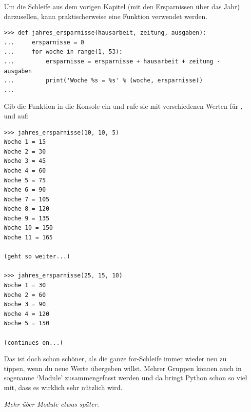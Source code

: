 Um die Schleife aus dem vorigen Kapitel (mit den Ersparnissen über das Jahr) darzusellen, kann praktischerweise eine Funktion verwendet werden.

\begin{Verbatim}[frame=single]
>>> def jahres_ersparnisse(hausarbeit, zeitung, ausgaben):
...     ersparnisse = 0
...     for woche in range(1, 53):
...         ersparnisse = ersparnisse + hausarbeit + zeitung - ausgaben
...         print('Woche %s = %s' % (woche, ersparnisse))
...
\end{Verbatim}

Gib die Funktion in die Konsole ein und rufe sie mit verschiedenen Werten für ,  und  auf:




\begin{Verbatim}[frame=single, label=Ausgabe]
>>> jahres_ersparnisse(10, 10, 5)
Woche 1 = 15
Woche 2 = 30
Woche 3 = 45
Woche 4 = 60
Woche 5 = 75
Woche 6 = 90
Woche 7 = 105
Woche 8 = 120
Woche 9 = 135
Woche 10 = 150
Woche 11 = 165

(geht so weiter...)

>>> jahres_ersparnisse(25, 15, 10)
Woche 1 = 30
Woche 2 = 60
Woche 3 = 90
Woche 4 = 120
Woche 5 = 150

(continues on...)
\end{Verbatim}

Das ist doch schon schöner, als die ganze for-Schleife immer wieder neu zu tippen, wenn du neue Werte übergeben willst. Mehrer Gruppen können auch in sogenanne `Module' zusammengefasst werden und da bringt Python schon so viel mit, dass es wirklich sehr nützlich wird.
\par
\noindent
\emph{Mehr über Module etwas später.}

